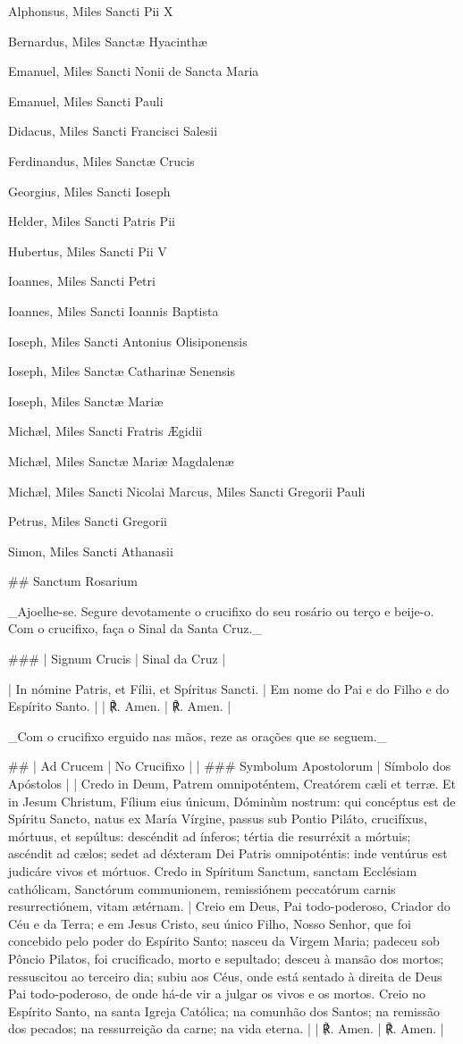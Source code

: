 Alphonsus, Miles Sancti Pii X

Bernardus, Miles Sanctæ Hyacinthæ

Emanuel, Miles Sancti Nonii de Sancta Maria

Emanuel, Miles Sancti Pauli

Didacus, Miles Sancti Francisci Salesii

Ferdinandus, Miles Sanctæ Crucis

Georgius, Miles Sancti Ioseph

Helder, Miles Sancti Patris Pii

Hubertus, Miles Sancti Pii V

Ioannes, Miles Sancti Petri

Ioannes, Miles Sancti Ioannis Baptista

Ioseph, Miles Sancti Antonius Olisiponensis

Ioseph, Miles Sanctæ Catharinæ Senensis

Ioseph, Miles Sanctæ Mariæ

Michæl, Miles Sancti Fratris Ægidii

Michæl, Miles Sanctæ Mariæ Magdalenæ

Michæl, Miles Sancti Nicolai
\switchcolumn
Marcus, Miles Sancti Gregorii Pauli

Petrus, Miles Sancti Gregorii

Simon, Miles Sancti Athanasii

## Sanctum Rosarium

_Ajoelhe-se. Segure devotamente o crucifixo do seu rosário ou terço e beije-o. Com o crucifixo, faça o Sinal da Santa Cruz._

### | Signum Crucis | Sinal da Cruz |

| In nómine Patris, et Fílii, et Spíritus Sancti. | Em nome do Pai e do Filho e do Espírito Santo. |
| ℟. Amen. | ℟. Amen. |

_Com o crucifixo erguido nas mãos, reze as orações que se seguem._

## | Ad Crucem | No Crucifixo |
| ### Symbolum Apostolorum | Símbolo dos Apóstolos |
| Credo in Deum, Patrem omnipoténtem, Creatórem cæli et terræ. Et in Jesum Christum, Fílium eius únicum, Dóminùm nostrum: qui concéptus est de Spíritu Sancto, natus ex María Vírgine, passus sub Pontio Piláto, crucifíxus, mórtuus, et sepúltus: descéndit ad ínferos; tértia die resurréxit a mórtuis; ascéndit ad cælos; sedet ad déxteram Dei Patris omnipoténtis: inde ventúrus est judicáre vivos et mórtuos. Credo in Spíritum Sanctum, sanctam Ecclésiam cathólicam, Sanctórum communionem, remissiónem peccatórum carnis resurrectiónem, vitam ætérnam. | Creio em Deus, Pai todo-poderoso, Criador do Céu e da Terra; e em Jesus Cristo, seu único Filho, Nosso Senhor, que foi concebido pelo poder do Espírito Santo; nasceu da Virgem Maria; padeceu sob Pôncio Pilatos, foi crucificado, morto e sepultado; desceu à mansão dos mortos; ressuscitou ao terceiro dia; subiu aos Céus, onde está sentado à direita de Deus Pai todo-poderoso, de onde há-de vir a julgar os vivos e os mortos. Creio no Espírito Santo, na santa Igreja Católica; na comunhão dos Santos; na remissão dos pecados; na ressurreição da carne; na vida eterna. |
| ℟. Amen. | ℟. Amen. |

